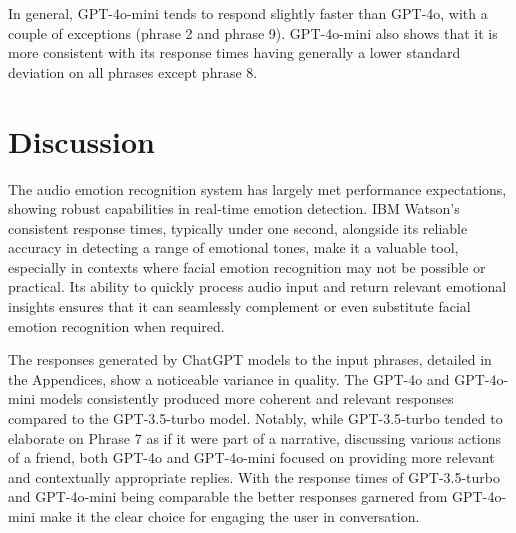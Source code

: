In general, GPT-4o-mini tends to respond slightly faster than GPT-4o, with a couple of exceptions (phrase 2 and phrase 9). GPT-4o-mini also shows that it is more consistent with its response times having generally a lower standard deviation on all phrases except phrase 8.

\section{Discussion}

The audio emotion recognition system has largely met performance expectations, showing robust capabilities in real-time emotion detection. IBM Watson's consistent response times, typically under one second, alongside its reliable accuracy in detecting a range of emotional tones, make it a valuable tool, especially in contexts where facial emotion recognition may not be possible or practical. Its ability to quickly process audio input and return relevant emotional insights ensures that it can seamlessly complement or even substitute facial emotion recognition when required.

The responses generated by ChatGPT models to the input phrases, detailed in the Appendices, show a noticeable variance in quality. The GPT-4o and GPT-4o-mini models consistently produced more coherent and relevant responses compared to the GPT-3.5-turbo model. Notably, while GPT-3.5-turbo tended to elaborate on Phrase 7 as if it were part of a narrative, discussing various actions of a friend, both GPT-4o and GPT-4o-mini focused on providing more relevant and contextually appropriate replies. With the response times of GPT-3.5-turbo and GPT-4o-mini being comparable the better responses garnered from GPT-4o-mini make it the clear choice for engaging the user in conversation.
